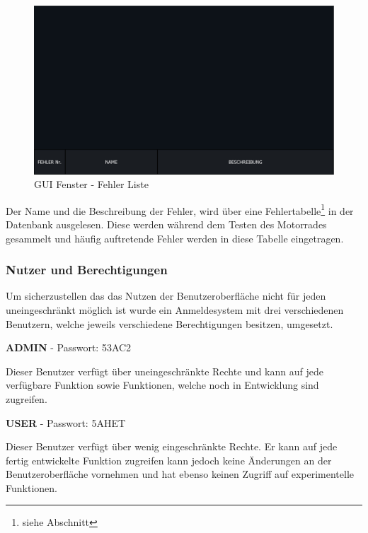 \begin{figure}[H]
	\begin{center}
		\includegraphics[scale=0.25]{figures/hcis/window_error.png}
			\caption{GUI Fenster - Fehler Liste}
			\label{fig:pageError}
	\end{center}
\end{figure}

Der Name und die Beschreibung der Fehler, wird über eine Fehlertabelle\footnote{siehe Abschnitt } in der Datenbank ausgelesen. Diese werden während dem Testen des Motorrades gesammelt und häufig auftretende Fehler werden in diese Tabelle eingetragen. 

\subsubsection{Nutzer und Berechtigungen}

Um sicherzustellen das das Nutzen der Benutzeroberfläche nicht für jeden uneingeschränkt möglich ist wurde ein Anmeldesystem mit drei verschiedenen Benutzern, welche jeweils verschiedene Berechtigungen besitzen, umgesetzt.

{\small \textbf{ADMIN}} - Passwort: 53AC2\\ \vspace{2mm}


Dieser Benutzer verfügt über uneingeschränkte Rechte und kann auf jede verfügbare Funktion sowie Funktionen, welche noch in Entwicklung sind zugreifen.

{\small \textbf{USER}} - Passwort: 5AHET\\ \vspace{2mm}

Dieser Benutzer verfügt über wenig eingeschränkte Rechte. Er kann auf jede fertig entwickelte Funktion zugreifen kann jedoch keine Änderungen an der Benutzeroberfläche vornehmen und hat ebenso keinen Zugriff auf experimentelle Funktionen.

